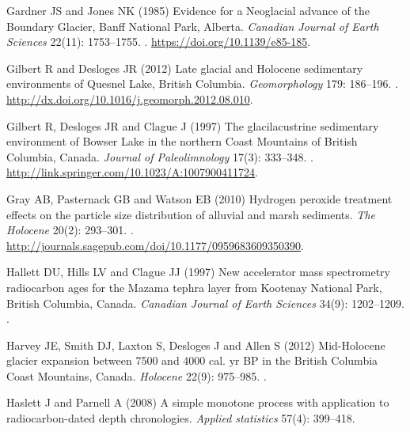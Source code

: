 \documentclass[Royal,times,doublespace,sageh]{sagej}
\begin{document}
\begin{thebibliography}{69}
Gardner JS and Jones NK (1985) {Evidence for a Neoglacial advance of the
  Boundary Glacier, Banff National Park, Alberta}.
\newblock \emph{Canadian Journal of Earth Sciences} 22(11): 1753--1755.
\newblock {}.
\newblock \urlprefix\url{https://doi.org/10.1139/e85-185}.

Gilbert R and Desloges JR (2012) {Late glacial and Holocene sedimentary
  environments of Quesnel Lake, British Columbia}.
\newblock \emph{Geomorphology} 179: 186--196.
\newblock {}.
\newblock \urlprefix\url{http://dx.doi.org/10.1016/j.geomorph.2012.08.010}.

Gilbert R, Desloges JR and Clague J (1997) {The glacilacustrine sedimentary
  environment of Bowser Lake in the northern Coast Mountains of British
  Columbia, Canada}.
\newblock \emph{Journal of Paleolimnology} 17(3): 333--348.
\newblock {}.
\newblock \urlprefix\url{http://link.springer.com/10.1023/A:1007900411724}.

Gray AB, Pasternack GB and Watson EB (2010) {Hydrogen peroxide treatment
  effects on the particle size distribution of alluvial and marsh sediments}.
\newblock \emph{The Holocene} 20(2): 293--301.
\newblock {}.
\newblock
  \urlprefix\url{http://journals.sagepub.com/doi/10.1177/0959683609350390}.

Hallett DU, Hills LV and Clague JJ (1997) {New accelerator mass spectrometry
  radiocarbon ages for the Mazama tephra layer from Kootenay National Park,
  British Columbia, Canada}.
\newblock \emph{Canadian Journal of Earth Sciences} 34(9): 1202--1209.
\newblock {}.

Harvey JE, Smith DJ, Laxton S, Desloges J and Allen S (2012) {Mid-Holocene
  glacier expansion between 7500 and 4000 cal. yr BP in the British Columbia
  Coast Mountains, Canada}.
\newblock \emph{Holocene} 22(9): 975--985.
\newblock {}.

Haslett J and Parnell A (2008) {A simple monotone process with application to
  radiocarbon-dated depth chronologies}.
\newblock \emph{Applied statistics} 57(4): 399--418.


\end{thebibliography}
\end{document}
